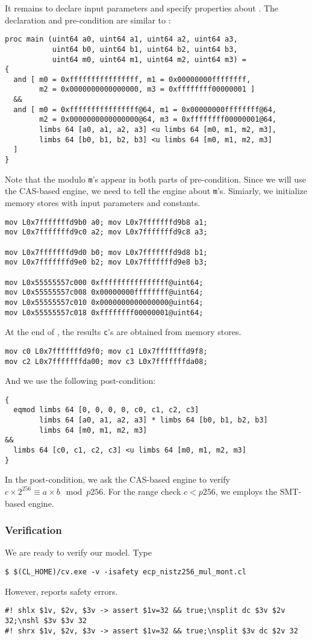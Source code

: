 \documentclass{amsproc}
\begin{document}
It remains to declare input parameters and specify properties about
\nistzmul. The declaration and pre-condition are similar to \nistzadd:
\begin{verbatim}
proc main (uint64 a0, uint64 a1, uint64 a2, uint64 a3,
           uint64 b0, uint64 b1, uint64 b2, uint64 b3,
           uint64 m0, uint64 m1, uint64 m2, uint64 m3) =
{
  and [ m0 = 0xffffffffffffffff, m1 = 0x00000000ffffffff,
        m2 = 0x0000000000000000, m3 = 0xffffffff00000001 ]
  &&
  and [ m0 = 0xffffffffffffffff@64, m1 = 0x00000000ffffffff@64,
        m2 = 0x0000000000000000@64, m3 = 0xffffffff00000001@64,
        limbs 64 [a0, a1, a2, a3] <u limbs 64 [m0, m1, m2, m3],
        limbs 64 [b0, b1, b2, b3] <u limbs 64 [m0, m1, m2, m3]
  ]
}
\end{verbatim}
Note that the modulo \texttt{m}'s appear in both parts of
pre-condition. Since we will use the CAS-based engine, we need to tell
the engine about \texttt{m}'s. Simiarly, we initialize memory stores
with input parameters and constants.
\begin{verbatim}
mov L0x7fffffffd9b0 a0; mov L0x7fffffffd9b8 a1;
mov L0x7fffffffd9c0 a2; mov L0x7fffffffd9c8 a3;

mov L0x7fffffffd9d0 b0; mov L0x7fffffffd9d8 b1;
mov L0x7fffffffd9e0 b2; mov L0x7fffffffd9e8 b3;

mov L0x55555557c000 0xffffffffffffffff@uint64;
mov L0x55555557c008 0x00000000ffffffff@uint64;
mov L0x55555557c010 0x0000000000000000@uint64;
mov L0x55555557c018 0xffffffff00000001@uint64;
\end{verbatim}

At the end of \nistzmulcl, the results \texttt{c}'s are obtained from
memory stores.
\begin{verbatim}
mov c0 L0x7fffffffd9f0; mov c1 L0x7fffffffd9f8;
mov c2 L0x7fffffffda00; mov c3 L0x7fffffffda08;
\end{verbatim}
And we use the following post-condition:
\begin{verbatim}
{
  eqmod limbs 64 [0, 0, 0, 0, c0, c1, c2, c3]
        limbs 64 [a0, a1, a2, a3] * limbs 64 [b0, b1, b2, b3]
        limbs 64 [m0, m1, m2, m3]
&&
  limbs 64 [c0, c1, c2, c3] <u limbs 64 [m0, m1, m2, m3]
}
\end{verbatim}
In the post-condition, we ask the CAS-based engine to verify $c \times
2^{256} \equiv a \times b \mod p256$. For the range check $c < p256$,
we employs the SMT-based engine.

\subsubsection{Verification}

We are ready to verify our model. Type
\begin{verbatim}
$ $(CL_HOME)/cv.exe -v -isafety ecp_nistz256_mul_mont.cl
\end{verbatim}

However, \cryptoline reports safety errors. 


\begin{verbatim}
#! shlx $1v, $2v, $3v -> assert $1v=32 && true;\nsplit dc $3v $2v 32;\nshl $3v $3v 32
#! shrx $1v, $2v, $3v -> assert $1v=32 && true;\nsplit $3v dc $2v 32
\end{verbatim}
\end{document}
